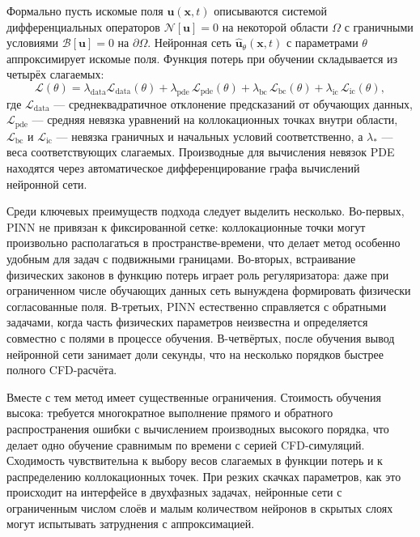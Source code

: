 Формально пусть искомые поля $\mathbf{u}(\mathbf{x}, t)$ описываются системой
дифференциальных операторов $\mathcal{N}[\mathbf{u}]=0$ на некоторой области
$\Omega$ с граничными условиями $\mathcal{B}[\mathbf{u}]=0$ на $\partial\Omega$.
Нейронная сеть $\hat{\mathbf{u}}_\theta(\mathbf{x}, t)$ с параметрами $\theta$
аппроксимирует искомые поля. Функция потерь при обучении складывается из четырёх
слагаемых:
\begin{equation}
\mathcal{L}(\theta) = \lambda_{\mathrm{data}}\mathcal{L}_{\mathrm{data}}(\theta)
  + \lambda_{\mathrm{pde}}\,\mathcal{L}_{\mathrm{pde}}(\theta)
  + \lambda_{\mathrm{bc}}\,\mathcal{L}_{\mathrm{bc}}(\theta)
  + \lambda_{\mathrm{ic}}\,\mathcal{L}_{\mathrm{ic}}(\theta),
\end{equation}
где $\mathcal{L}_{\mathrm{data}}$ --- среднеквадратичное отклонение предсказаний
от обучающих данных, $\mathcal{L}_{\mathrm{pde}}$ --- средняя невязка уравнений
на коллокационных точках внутри области, $\mathcal{L}_{\mathrm{bc}}$ и $\mathcal{L}_{\mathrm{ic}}$ ---
невязка граничных и начальных условий соответственно, а $\lambda_{*}$
--- веса соответствующих слагаемых. Производные для вычисления невязок PDE
находятся через автоматическое дифференцирование графа вычислений нейронной сети.

Среди ключевых преимуществ подхода следует выделить несколько. Во-первых,
PINN не привязан к фиксированной сетке: коллокационные точки могут произвольно
располагаться в пространстве-времени, что делает метод особенно удобным для
задач с подвижными границами. Во-вторых, встраивание физических законов в
функцию потерь играет роль регуляризатора: даже при ограниченном числе
обучающих данных сеть вынуждена формировать физически согласованные поля.
В-третьих, PINN естественно справляется с обратными задачами, когда часть
физических параметров неизвестна и определяется совместно с полями в процессе
обучения. В-четвёртых, после обучения вывод нейронной сети занимает доли
секунды, что на несколько порядков быстрее полного CFD-расчёта.

Вместе с тем метод имеет существенные ограничения. Стоимость обучения высока:
требуется многократное выполнение прямого и обратного распространения ошибки с вычислением
производных высокого порядка, что делает одно обучение сравнимым по времени
с серией CFD-симуляций. Сходимость чувствительна к выбору весов слагаемых в функции потерь и к
распределению коллокационных точек. При резких скачках параметров, как это
происходит на интерфейсе в двухфазных задачах, нейронные сети с
ограниченным числом слоёв и малым количеством нейронов в скрытых слоях могут испытывать затруднения с
аппроксимацией.

